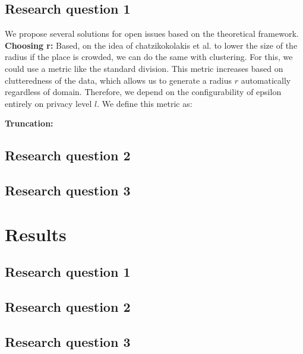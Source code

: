 \subsection{Research question 1}
We propose several solutions for open issues based on the theoretical framework. \newline
\textbf{Choosing r: } Based, on the idea of chatzikokolakis et al. to lower the size of the radius if the place is crowded, we can do the same with clustering.
For this, we could use a metric like the standard division.
This metric increases based on clutteredness of the data, which allows us to generate a radius $r$ automatically regardless of domain.
Therefore, we depend on the configurability of epsilon entirely on privacy level $l$.
We define this metric as:

\textbf{Truncation: }
\subsection{Research question 2}
\subsection{Research question 3}
\section{Results}
\subsection{Research question 1}
\subsection{Research question 2}
\subsection{Research question 3}